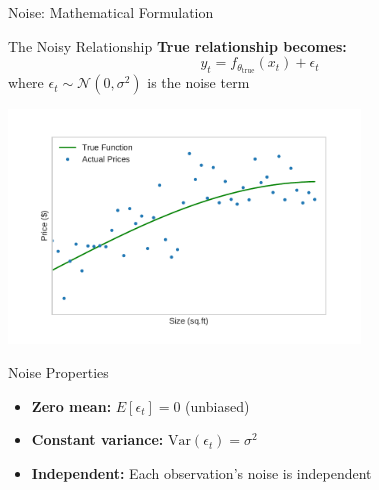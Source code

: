 \documentclass[10pt]{beamer}
\newcommand{\fitpic}[1]{\begin{adjustbox}{max width=\linewidth, max totalheight=0.78\textheight}#1\end{adjustbox}}
\begin{document}
\begin{frame}{Noise: Mathematical Formulation}
\begin{keypointsbox}{The Noisy Relationship}
\textbf{True relationship becomes:}
$$y_t = f_{\theta_{\text{true}}}(x_t) + \epsilon_t$$
where $\epsilon_t \sim \mathcal{N}(0, \sigma^2)$ is the noise term
\end{keypointsbox}

\begin{center}
\fitpic{\includegraphics[width=0.7\textwidth]{../assets/bias-variance/figures/data.pdf}}
\end{center}

\begin{definitionbox}{Noise Properties}
\begin{itemize}
\item \textbf{Zero mean:} $E[\epsilon_t] = 0$ (unbiased)
\item \textbf{Constant variance:} $\text{Var}(\epsilon_t) = \sigma^2$
\item \textbf{Independent:} Each observation's noise is independent
\end{itemize}
\end{definitionbox}
\end{frame}
\end{document}
